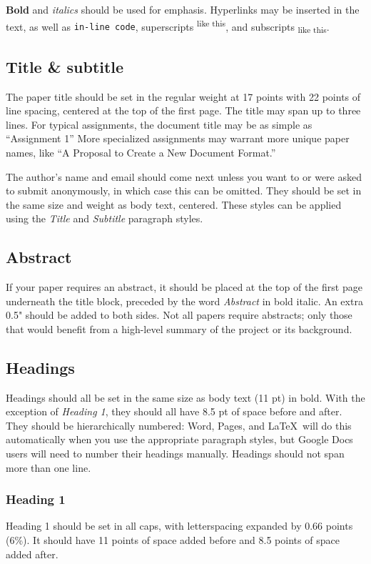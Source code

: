 \documentclass[
	letterpaper, %
]{jdf}
\begin{document}
\textbf{Bold} and \textit{italics} should be used for emphasis. Hyperlinks may be inserted in the text, as well as {\tt in-line code}, superscripts\textsuperscript{ like this}, and subscripts\textsubscript{ like this}.

\subsection{Title \& subtitle}
The paper title should be set in the regular weight at 17 points with 22 points of line spacing, centered at the top of the first page. The title may span up to three lines. For typical assignments, the document title may be as simple as “Assignment 1” More specialized assignments may warrant more unique paper names, like “A Proposal to Create a New Document Format.”

The author’s name and email should come next unless you want to or were asked to submit anonymously, in which case this can be omitted. They should be set in the same size and weight as body text, centered. These styles can be applied using the \emph{Title} and \emph{Subtitle} paragraph styles.

\subsection{Abstract}
If your paper requires an abstract, it should be placed at the top of the first page underneath the title block, preceded by the word \emph{Abstract} in bold italic. An extra 0.5" should be added to both sides. Not all papers require abstracts; only those that would benefit from a high-level summary of the project or its background.

\subsection{Headings}
Headings should all be set in the same size as body text (11 pt) in bold. With the exception of \emph{Heading 1}, they should all have 8.5 pt of space before and after. They should be hierarchically numbered: Word, Pages, and \LaTeX\ will do this automatically when you use the appropriate paragraph styles, but Google Docs users will need to number their headings manually. Headings should not span more than one line.

\subsubsection{Heading 1}
Heading 1 should be set in all caps, with letterspacing expanded by 0.66 points (6\%). It should have 11 points of space added before and 8.5 points of space added after.
\end{document}
